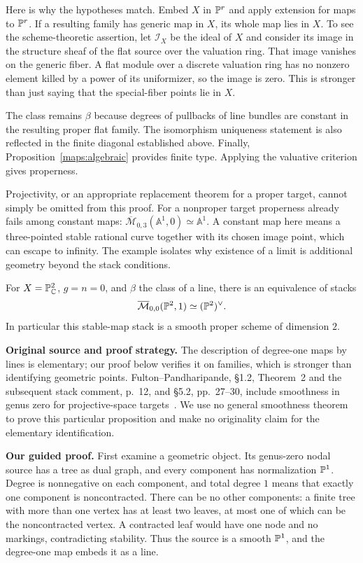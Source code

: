 Here is why the hypotheses match. Embed $X$ in $\mathbb P^r$ and apply extension for maps to $\mathbb P^r$. If a resulting family has generic map in $X$, its whole map lies in $X$. To see the scheme-theoretic assertion, let $\mathcal I_X$ be the ideal of $X$ and consider its image in the structure sheaf of the flat source over the valuation ring. That image vanishes on the generic fiber. A flat module over a discrete valuation ring has no nonzero element killed by a power of its uniformizer, so the image is zero. This is stronger than just saying that the special-fiber points lie in $X$.

The class remains $\beta$ because degrees of pullbacks of line bundles are constant in the resulting proper flat family. The isomorphism uniqueness statement is also reflected in the finite diagonal established above. Finally, Proposition~\ref{maps:algebraic} provides finite type. Applying the valuative criterion gives properness.

Projectivity, or an appropriate replacement theorem for a proper target, cannot simply be omitted from this proof. For a nonproper target properness already fails among constant maps: $\overline{\mathcal M}_{0,3}(\mathbb A^1,0)\simeq\mathbb A^1$. A constant map here means a three-pointed stable rational curve together with its chosen image point, which can escape to infinity. The example isolates why existence of a limit is additional geometry beyond the stack conditions.

\begin{Prop}\label{maps:lines-smooth}
For $X=\mathbb P^2_{\mathbb C}$, $g=n=0$, and $\beta$ the class of a line, there is an equivalence of stacks
\[
 \overline{\mathcal M}_{0,0}(\mathbb P^2,1)\simeq(\mathbb P^2)^\vee.
\]
In particular this stable-map stack is a smooth proper scheme of dimension $2$.
\end{Prop}

\noindent\textbf{Original source and proof strategy.}
The description of degree-one maps by lines is elementary; our proof below verifies it on families, which is stronger than identifying geometric points. Fulton--Pandharipande, \S1.2, Theorem~2 and the subsequent stack comment, p.~12, and \S5.2, pp.~27--30, include smoothness in genus zero for projective-space targets~\cite{FP}. We use no general smoothness theorem to prove this particular proposition and make no originality claim for the elementary identification.

\noindent\textbf{Our guided proof.}
First examine a geometric object. Its genus-zero nodal source has a tree as dual graph, and every component has normalization $\mathbb P^1$. Degree is nonnegative on each component, and total degree $1$ means that exactly one component is noncontracted. There can be no other components: a finite tree with more than one vertex has at least two leaves, at most one of which can be the noncontracted vertex. A contracted leaf would have one node and no markings, contradicting stability. Thus the source is a smooth $\mathbb P^1$, and the degree-one map embeds it as a line.

